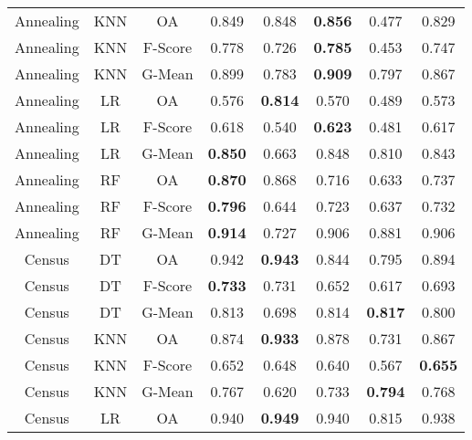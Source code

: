 \begin{longtable}{cccccccc}
      Annealing &        KNN &      OA &          0.849 &          0.848 & \textbf{0.856} &          0.477 &          0.829 \\
      Annealing &        KNN & F-Score &          0.778 &          0.726 & \textbf{0.785} &          0.453 &          0.747 \\
      Annealing &        KNN &  G-Mean &          0.899 &          0.783 & \textbf{0.909} &          0.797 &          0.867 \\
      Annealing &         LR &      OA &          0.576 & \textbf{0.814} &          0.570 &          0.489 &          0.573 \\
      Annealing &         LR & F-Score &          0.618 &          0.540 & \textbf{0.623} &          0.481 &          0.617 \\
      Annealing &         LR &  G-Mean & \textbf{0.850} &          0.663 &          0.848 &          0.810 &          0.843 \\
      Annealing &         RF &      OA & \textbf{0.870} &          0.868 &          0.716 &          0.633 &          0.737 \\
      Annealing &         RF & F-Score & \textbf{0.796} &          0.644 &          0.723 &          0.637 &          0.732 \\
      Annealing &         RF &  G-Mean & \textbf{0.914} &          0.727 &          0.906 &          0.881 &          0.906 \\
         Census &         DT &      OA &          0.942 & \textbf{0.943} &          0.844 &          0.795 &          0.894 \\
         Census &         DT & F-Score & \textbf{0.733} &          0.731 &          0.652 &          0.617 &          0.693 \\
         Census &         DT &  G-Mean &          0.813 &          0.698 &          0.814 & \textbf{0.817} &          0.800 \\
         Census &        KNN &      OA &          0.874 & \textbf{0.933} &          0.878 &          0.731 &          0.867 \\
         Census &        KNN & F-Score &          0.652 &          0.648 &          0.640 &          0.567 & \textbf{0.655} \\
         Census &        KNN &  G-Mean &          0.767 &          0.620 &          0.733 & \textbf{0.794} &          0.768 \\
         Census &         LR &      OA &          0.940 & \textbf{0.949} &          0.940 &          0.815 &          0.938 \\

\end{longtable}
